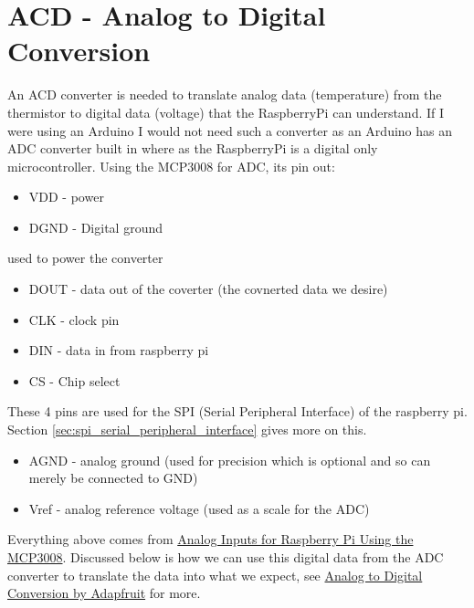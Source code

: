 \documentclass{article}
\begin{document}
	\section{ACD - Analog to Digital Conversion} %
	\label{sec:acd_analog_to_digital_conversion}
	An ACD converter is needed to translate analog data (temperature) from the thermistor to digital data (voltage) that the RaspberryPi can understand. If I were using an Arduino I would not need such a converter as an Arduino has an ADC converter built in where as the RaspberryPi is a digital only microcontroller. Using the MCP3008 for ADC, its pin out:
	\begin{itemize}
	\item VDD - power
	\item DGND - Digital ground
	\end{itemize}
	used to power the converter
	\begin{itemize}
	\item DOUT - data out of the coverter (the covnerted data we desire)
	\item CLK - clock pin
	\item DIN - data in from raspberry pi
	\item CS - Chip select
	\end{itemize}
	These 4 pins are used for the SPI (Serial Peripheral Interface) of the raspberry pi. Section \ref{sec:spi_serial_peripheral_interface} gives more on this.

	\begin{itemize}
		\item AGND - analog ground (used for precision which is optional and so can merely be connected to GND)
		\item Vref - analog reference voltage (used as a scale for the ADC)
	\end{itemize}

	Everything above comes from \href{https://learn.adafruit.com/reading-a-analog-in-and-controlling-audio-volume-with-the-raspberry-pi?view=all}{Analog Inputs for Raspberry Pi Using the MCP3008}. Discussed below is how we can use this digital data from the ADC converter to translate the data into what we expect, see \href{https://learn.sparkfun.com/tutorials/analog-to-digital-conversion/all#:~:text=An%20Analog%20to%20Digital%20Converter,pin%20to%20a%20digital%20number.&text=ADCs%20can%20vary%20greatly%20between,%5E10)%20discrete%20analog%20levels.}{Analog to Digital Conversion by Adapfruit} for more.
\end{document}
